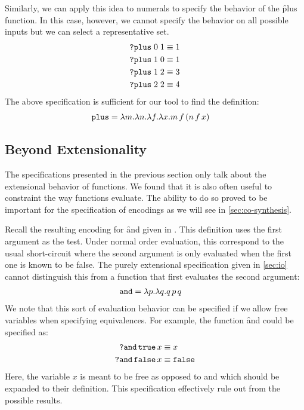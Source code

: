 Similarly, we can apply this idea to numerals to specify the
behavior of the \f{plus} function.
%
In this case, however, we cannot specify the behavior on all
possible inputs but we can select a representative set.
%
\begin{align*}
  \texttt{?plus}\; 0\; 1 &\equiv 1\\
  \texttt{?plus}\; 1\; 0 &\equiv 1\\
  \texttt{?plus}\; 1\; 2 &\equiv 3\\
  \texttt{?plus}\; 2\; 2 &\equiv 4\\
\end{align*}
%
The above specification is sufficient for our tool to find
the definition:
%
\begin{align}
  \label{eq:plus-def}
  \texttt{plus} &= \lambda m. \lambda n. \lambda f. \lambda x. m\,f\,(n\,f\,x)
\end{align}

\subsection{Beyond Extensionality}
%
The specifications presented in the previous section only
talk about the extensional behavior of functions.
%
We found that it is also often useful to constraint the way
functions evaluate.
%
The ability to do so proved to be important for the
specification of encodings as we will see in
\cref{sec:co-synthesis}.

Recall the resulting encoding for \f{and} given in
.
%
This definition uses the first argument as the test.
%
Under normal order evaluation, this correspond to the usual
short-circuit where the second argument is only
evaluated when the first one is known to be false.
%
The purely extensional specification given in \cref{sec:io}
cannot distinguish this from a function that first
evaluates the second argument:
%
\begin{align}
  \label{eq:and-def2}
  \texttt{and} &= \lambda p. \lambda q. q\,p\,q
\end{align}
%
We note that this sort of evaluation behavior can be
specified if we allow free variables when specifying
equivalences.
%
For example, the function \f{and} could be specified as:
%
\begin{align*}
  \texttt{?and}\,\texttt{true}\,x &\equiv x \\
  \texttt{?and}\,\texttt{false}\,x &\equiv \texttt{false} \\
\end{align*}
%
Here, the variable $x$ is meant to be free as opposed to
\true and \false which should be expanded to their
definition.
%
This specification effectively rule out
 from the possible results.

